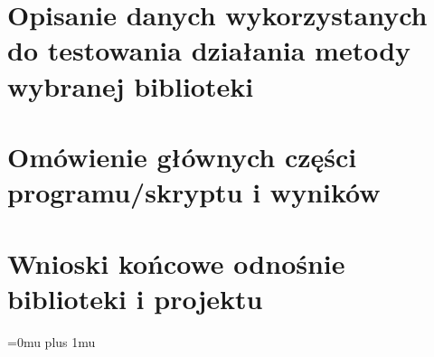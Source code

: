 \documentclass[10pt,a4paper]{article}
\begin{document}
\section{Opisanie danych wykorzystanych do testowania działania metody wybranej biblioteki}

\section{Omówienie głównych części programu/skryptu i wyników}

\section{Wnioski końcowe odnośnie biblioteki i projektu}

\Urlmuskip=0mu plus 1mu\relax
{}

\end{document}
